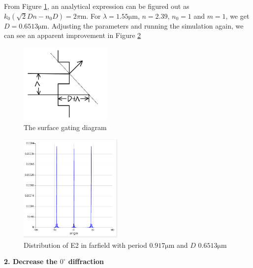 \documentclass[fontsize=11pt]{scrartcl}
\begin{document}
From Figure \ref{fig1.3}, an analytical expression can be figured out 
as $k_{0}\left(\sqrt{2} D n-n_{0} D\right)=2 \pi \mathrm{m}$. For $\lambda=1.55\mathrm{\mu m}$, 
$n=2.39$, $n_0=1$ and $m=1$, we get $D=0.6513\mathrm{\mu m}$. 
Adjusting the parameters and running the simulation again, 
we can see an apparent improvement in Figure \ref{fig1.4}
\begin{figure}[H]
    \centering
     \includegraphics[width=0.4\textwidth]{img/fig1.3.png}
     \caption{The surface gating diagram}
     \label{fig1.3}
\end{figure}
\begin{figure}[H]
    \centering
     \includegraphics[width=0.45\textwidth]{img/fig1.4.png}
     \caption{Distribution of E2 in farfield with 
     period $0.917\mathrm{\mu m}$ and $D$ $0.6513\mathrm{\mu m}$}
     \label{fig1.4}
\end{figure}

\textbf{2. Decrease the $0^\circ$ diffraction}
\end{document}
